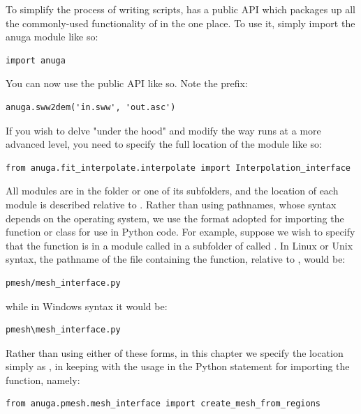 \documentclass{manual}
\begin{document}
To simplify the process of writing scripts, \anuga has a public API which packages
up all the commonly-used functionality of \anuga in the one place. To use it, simply
import the anuga module like so:

\begin{verbatim}
import anuga
\end{verbatim}

You can now use the public API like so. Note the  prefix:

\begin{verbatim}
anuga.sww2dem('in.sww', 'out.asc')
\end{verbatim}

If you wish to delve "under the hood" and modify the way \anuga runs at a more
advanced level, you need to specify the full location of the module like so:

\begin{verbatim}
from anuga.fit_interpolate.interpolate import Interpolation_interface
\end{verbatim}

All modules are in the folder  or one of its subfolders, and the
location of each module is described relative to . Rather
than using pathnames, whose syntax depends on the operating system,
we use the format adopted for importing the function or class for
use in Python code. For example, suppose we wish to specify that the
function  is in a module called
 in a subfolder of  called
. In Linux or Unix syntax, the pathname of the file
containing the function, relative to , would be:

\begin{verbatim}
pmesh/mesh_interface.py
\end{verbatim}

\label{sec:mesh interface}
while in Windows syntax it would be:

\begin{verbatim}
pmesh\mesh_interface.py
\end{verbatim}

Rather than using either of these forms, in this chapter we specify
the location simply as , in keeping with
the usage in the Python statement for importing the function,
namely:

\begin{verbatim}
from anuga.pmesh.mesh_interface import create_mesh_from_regions
\end{verbatim}
\end{document}
